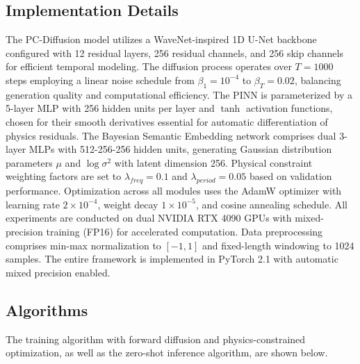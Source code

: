 \documentclass[journal]{IEEEtran}
\begin{document}
\subsection{Implementation Details}
The PC-Diffusion model utilizes a WaveNet-inspired 1D U-Net backbone configured with 12 residual layers, 256 residual channels, and 256 skip channels for efficient temporal modeling. The diffusion process operates over $T = 1000$ steps employing a linear noise schedule from $\beta_1 = 10^{-4}$ to $\beta_T = 0.02$, balancing generation quality and computational efficiency. The PINN is parameterized by a 5-layer MLP with 256 hidden units per layer and $\tanh$ activation functions, chosen for their smooth derivatives essential for automatic differentiation of physics residuals. The Bayesian Semantic Embedding network comprises dual 3-layer MLPs with 512-256-256 hidden units, generating Gaussian distribution parameters $\mu$ and $\log \sigma^2$ with latent dimension 256. Physical constraint weighting factors are set to $\lambda_{freq} = 0.1$ and $\lambda_{period} = 0.05$ based on validation performance. Optimization across all modules uses the AdamW optimizer with learning rate $2 \times 10^{-4}$, weight decay $1 \times 10^{-5}$, and cosine annealing schedule. All experiments are conducted on dual NVIDIA RTX 4090 GPUs with mixed-precision training (FP16) for accelerated computation. Data preprocessing comprises min-max normalization to $[-1, 1]$ and fixed-length windowing to 1024 samples. The entire framework is implemented in PyTorch 2.1 with automatic mixed precision enabled.

\subsection{Algorithms}
The training algorithm with forward diffusion and physics-constrained optimization, as well as the zero-shot inference algorithm, are shown below.
\end{document}
